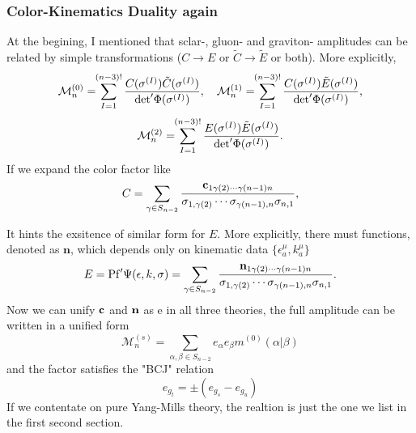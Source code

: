 \documentclass{beamer}
\begin{document}
\begin{frame}
    \frametitle{Color-Kinematics Duality again}
    At the begining, I mentioned that sclar-, gluon- and graviton- amplitudes can be related by simple transformations ($C\to E$ or $\tilde{C}\to\tilde{E}$ or both).
    More explicitly,
    \begin{equation*}
        {\cal M}^{(0)}_n =\!\!\sum_{I=1}^{(n-3)!}\frac{C(\sigma^{(I)}){\tilde C}(\sigma^{(I)})}{{\rm det}'\Phi(\sigma^{(I)})},\quad {\cal M}^{(1)}_n = \!\!\sum_{I=1}^{(n-3)!}\frac{C(\sigma^{(I)}){\tilde E}(\sigma^{(I)})}{{\rm det}'\Phi(\sigma^{(I)})},
    \end{equation*}
    \begin{equation*}
        {\cal M}^{(2)}_n = \!\!\sum_{I=1}^{(n-3)!}\frac{E(\sigma^{(I)}){\tilde E}(\sigma^{(I)})}{{\rm det}'\Phi(\sigma^{(I)})}.
    \end{equation*}
    If we expand the color factor like 
    \begin{equation*}
        C=\sum_{\gamma\in S_{n-2}}\frac{{\bf c}_{1\gamma(2)\cdots\gamma(n-1)n}}{\sigma_{1,\gamma(2)}\cdots\sigma_{\gamma(n-1),n}\sigma_{n,1}},
    \end{equation*}
\end{frame}
\begin{frame}
    It hints the exsitence of similar form for $E$. More explicitly, there must functions, denoted as $\boldsymbol{n}$, which depends only on kinematic data $\{\epsilon^{\mu}_a,k^\mu_a \}$
    \begin{equation*}
        E = {\rm Pf}'\Psi(\epsilon,k,\sigma ) = \sum_{\gamma\in S_{n-2}}\frac{{\bf n}_{1\gamma(2)\cdots\gamma(n-1)n}}{\sigma_{1,\gamma(2)}\cdots\sigma_{\gamma(n-1),n}\sigma_{n,1}}.
    \end{equation*}
    Now we can unify $\bf c$ and $\bf n$ as e in all three theories, the full amplitude can be written in a unified form
    \begin{equation*}
       \mathcal{M}_n^{(s)}=\sum_{\alpha,\beta\in S_{n-2}}e_\alpha e_\beta m^{(0)}(\alpha|\beta)
    \end{equation*}
    and the factor satisfies the "BCJ" relation
    \begin{equation*}
        e_{g_t}=\pm(e_{g_s}-e_{g_u})
    \end{equation*}
    If we contentate on pure Yang-Mills theory, the realtion is just the one we list in the first second section.
\end{frame}
\end{document}
